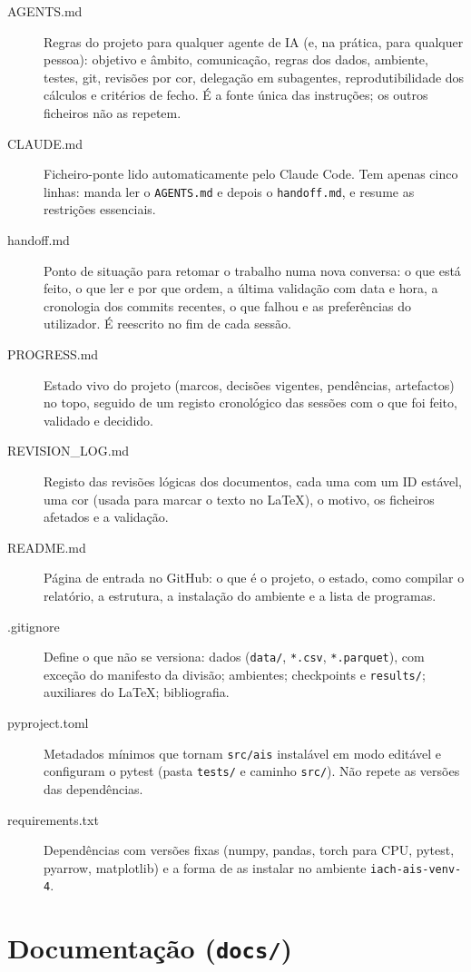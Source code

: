 \documentclass[11pt,a4paper]{article}
\newcommand{\f}[1]{\texttt{#1}}
\begin{document}
\begin{description}
\item[AGENTS.md] Regras do projeto para qualquer agente de IA (e, na prática, para qualquer
  pessoa): objetivo e âmbito, comunicação, regras dos dados, ambiente, testes, git, revisões por
  cor, delegação em subagentes, reprodutibilidade dos cálculos e critérios de fecho. É a fonte única
  das instruções; os outros ficheiros não as repetem.
\item[CLAUDE.md] Ficheiro-ponte lido automaticamente pelo Claude Code. Tem apenas cinco linhas:
  manda ler o \f{AGENTS.md} e depois o \f{handoff.md}, e resume as restrições essenciais.
\item[handoff.md] Ponto de situação para retomar o trabalho numa nova conversa: o que está feito, o
  que ler e por que ordem, a última validação com data e hora, a cronologia dos commits recentes, o
  que falhou e as preferências do utilizador. É reescrito no fim de cada sessão.
\item[PROGRESS.md] Estado vivo do projeto (marcos, decisões vigentes, pendências, artefactos) no
  topo, seguido de um registo cronológico das sessões com o que foi feito, validado e decidido.
\item[REVISION\_LOG.md] Registo das revisões lógicas dos documentos, cada uma com um ID estável,
  uma cor (usada para marcar o texto no LaTeX), o motivo, os ficheiros afetados e a validação.
\item[README.md] Página de entrada no GitHub: o que é o projeto, o estado, como compilar o
  relatório, a estrutura, a instalação do ambiente e a lista de programas.
\item[.gitignore] Define o que não se versiona: dados (\f{data/}, \f{*.csv}, \f{*.parquet}), com
  exceção do manifesto da divisão; ambientes; checkpoints e \f{results/}; auxiliares do LaTeX;
  bibliografia.
\item[pyproject.toml] Metadados mínimos que tornam \f{src/ais} instalável em modo editável e
  configuram o pytest (pasta \f{tests/} e caminho \f{src/}). Não repete as versões das dependências.
\item[requirements.txt] Dependências com versões fixas (numpy, pandas, torch para CPU, pytest,
  pyarrow, matplotlib) e a forma de as instalar no ambiente \f{iach-ais-venv-4}.
\end{description}

\section{Documentação (\f{docs/})}\label{sec:docs}
\end{document}
